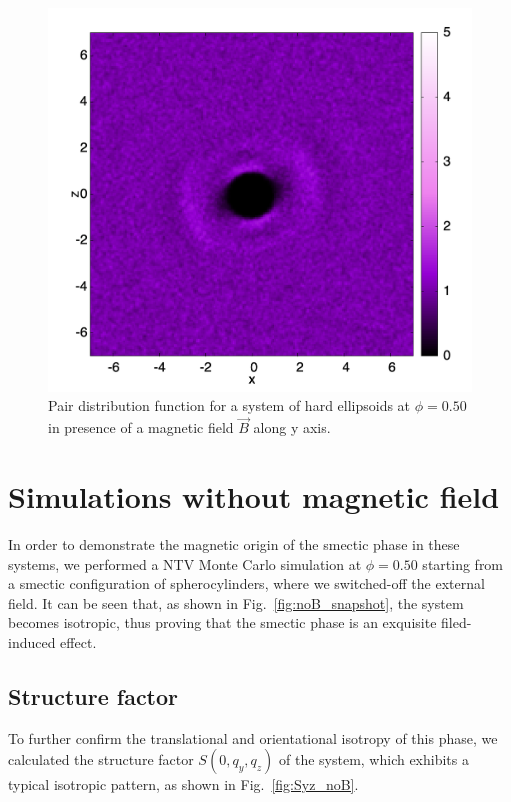 \documentclass[aip,graphicx]{revtex4-1} %
\begin{document}
\begin{figure}
    \centering
    \includegraphics[width=0.7\columnwidth]{gxz_B_HE.png}
    \caption{Pair distribution function for a system of hard ellipsoids at $\phi = 0.50$ in presence of a magnetic field $\vec{B}$ along y axis.}\label{fig:gxz_B_HE}
\end{figure}

\section{Simulations without magnetic field}

In order to demonstrate the magnetic origin of the smectic phase in these systems, we performed a NTV Monte Carlo simulation at $\phi=0.50$ starting from a smectic configuration  
of spherocylinders, where we switched-off the external field. 
It can be seen that, as shown in Fig.~\ref{fig:noB_snapshot}, the system becomes isotropic, thus proving that the smectic phase is an exquisite filed-induced effect.

\subsection{Structure factor}
To further confirm the translational and orientational isotropy of this phase, 
we calculated the structure factor $S(0, q_y, q_z)$ of the system, which exhibits a typical isotropic pattern, as shown in Fig.~\ref{fig:Syz_noB}.

\end{document}
